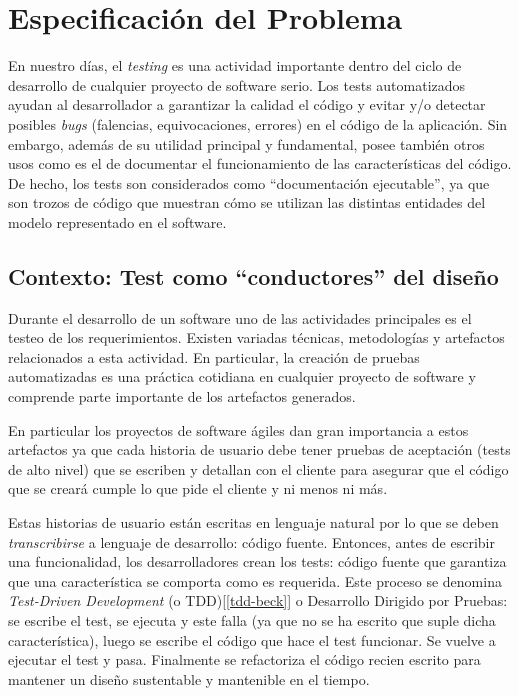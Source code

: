 \chapter{Especificación del Problema}

\par En nuestro días, el \emph{testing} es una actividad importante dentro del ciclo de desarrollo de cualquier proyecto de software serio. Los tests automatizados ayudan al desarrollador a garantizar la calidad el código y evitar y/o detectar posibles \emph{bugs} (falencias, equivocaciones, errores) en el código de la aplicación. Sin embargo, además de su utilidad principal y fundamental, posee también otros usos como es el de documentar el funcionamiento de las características del código. De hecho, los tests son considerados como ``documentación ejecutable'', ya que son trozos de código que muestran cómo se utilizan las distintas entidades del modelo representado en el software.



\section{Contexto: Test como ``conductores'' del diseño}
\par Durante el desarrollo de un software uno de las actividades principales es el testeo de los requerimientos. Existen variadas técnicas, metodologías y artefactos relacionados a esta actividad. En particular, la creación de pruebas automatizadas es una práctica cotidiana en cualquier proyecto de software y comprende parte importante de los artefactos generados. \\

\par En particular los proyectos de software ágiles dan gran importancia a estos artefactos ya que cada historia de usuario debe tener pruebas de aceptación (tests de alto nivel) que se escriben y detallan con el cliente para asegurar que el código que se creará cumple lo que pide el cliente y ni menos ni más.

\par Estas historias de usuario están escritas en lenguaje natural por lo que se deben \emph{transcribirse} a lenguaje de desarrollo: código fuente. Entonces, antes de escribir una funcionalidad, los desarrolladores crean los tests: código fuente que garantiza que una característica se comporta como es requerida. Este proceso se denomina \emph{Test-Driven Development} (o TDD)[\ref{tdd-beck}]  o Desarrollo Dirigido por Pruebas: se escribe el test, se ejecuta y este falla (ya que no se ha escrito que suple dicha característica), luego se escribe el código que hace el test funcionar. Se vuelve a ejecutar el test y pasa. Finalmente se refactoriza el código recien escrito para mantener un diseño sustentable y mantenible en el tiempo.

